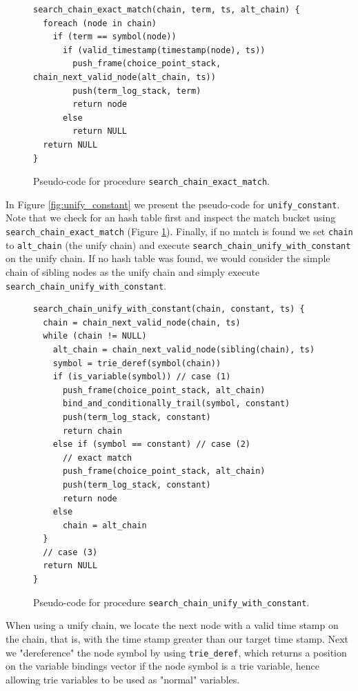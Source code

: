 \begin{figure}[ht]
\begin{Verbatim}
search_chain_exact_match(chain, term, ts, alt_chain) {
  foreach (node in chain)
    if (term == symbol(node))
      if (valid_timestamp(timestamp(node), ts))
        push_frame(choice_point_stack, chain_next_valid_node(alt_chain, ts))
        push(term_log_stack, term)
        return node
      else
        return NULL
  return NULL
}
\end{Verbatim}
\caption{Pseudo-code for procedure \texttt{search\_chain\_exact\_match}.}
\label{fig:search_chain_exact_match}
\end{figure}

In Figure \ref{fig:unify_constant} we present the pseudo-code for \texttt{unify\_constant}. Note that we check for an hash table first and inspect the match bucket using \texttt{search\_chain\_exact\_match} (Figure \ref{fig:search_chain_exact_match}).
Finally, if no match is found we set \texttt{chain} to \texttt{alt\_chain} (the unify chain) and execute \texttt{search\_chain\_unify\_with\_constant} on the unify chain. If no hash table was found, we would consider the simple chain of sibling nodes as the unify chain and simply execute \texttt{search\_chain\_unify\_with\_constant}.

\begin{figure}[ht]
\begin{Verbatim}
search_chain_unify_with_constant(chain, constant, ts) {
  chain = chain_next_valid_node(chain, ts)
  while (chain != NULL)
    alt_chain = chain_next_valid_node(sibling(chain), ts)
    symbol = trie_deref(symbol(chain))
    if (is_variable(symbol)) // case (1)
      push_frame(choice_point_stack, alt_chain)
      bind_and_conditionally_trail(symbol, constant)
      push(term_log_stack, constant)
      return chain
    else if (symbol == constant) // case (2)
      // exact match
      push_frame(choice_point_stack, alt_chain)
      push(term_log_stack, constant)
      return node
    else
      chain = alt_chain
  }
  // case (3)
  return NULL
}
\end{Verbatim}
\caption{Pseudo-code for procedure \texttt{search\_chain\_unify\_with\_constant}.}
\label{fig:search_chain_unify_with_constant}
\end{figure}

When using a unify chain, we locate the next node with a valid time stamp on the chain, that is,
with the time stamp greater than our target time stamp. Next we "dereference" the node symbol by using
\texttt{trie\_deref}, which returns a position on the variable bindings vector if the node symbol
is a trie variable, hence allowing trie variables to be used as "normal" variables.


